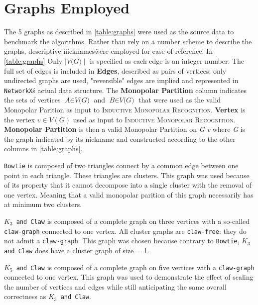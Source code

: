 \documentclass[11pt]{article}
\newcommand{\inlinecode}{\texttt}
\begin{document}

\section{Graphs Employed}
\label{subsec:graphs}
The 5 graphs as described in \ref{table:graphs} were used as the source data to benchmark the algorithms. Rather than rely on a number scheme to describe the graphs, descriptive \"nicknames\" were employed for ease of reference. In \ref{table:graphs} Only $\mid\textit{V(G)}\mid$ is specified as each edge is an integer number. The full set of edges is included in \textbf{Edges}, described as pairs of vertices; only undirected graphs are used, "reversible" edges are implied and represented in \inlinecode{NetworkX}\'s actual data structure. The \textbf{Monopolar Partition} column indicates the sets of vertices $\textit{A}\in\textit{V(G)}$ and $\textit{B}\in\textit{V(G)}$ that were used as the valid Monopolar Parition as input to \textsc{Inductive Monopolar Recognition}. \textbf{Vertex} is the vertex $\textit{v}\in{V(G)}$ used as input to \textsc{Inductive Monopolar Recognition}. \textbf{Monopolar Partition} is then a valid Monopolar Partition on \textit{G \em v} where \textit{G} is the graph indicated by its nickname and constructed according to the other columns in \ref{table:graphs}.

\inlinecode{Bowtie} is composed of two triangles connect by a common edge between one point in each triangle. These triangles are clusters. This graph was used because of its property that it cannot decompose into a single cluster with the removal of one vertex. Meaning that a valid monopolar parition of this graph necessarily has at minimum two clusters.

\inlinecode{$K_3$ and Claw} is composed of a complete graph on three vertices with a so-called \inlinecode{claw-graph} connected to one vertex. All cluster graphs are \inlinecode{claw-free}: they do not admit a \inlinecode{claw-graph}. This graph was chosen because contrary to \inlinecode{Bowtie}, \inlinecode{$K_3$ and Claw} does have a cluster graph of size = 1.

\inlinecode{$K_5$ and Claw} is composed of a complete graph on five vertices with a \inlinecode{claw-graph} connected to one vertex. This graph was used to demonstrate the effect of scaling the number of vertices and edges while still anticipating the same overall correctness as \inlinecode{$K_3$ and Claw}.
\end{document}
